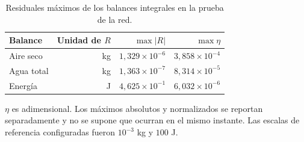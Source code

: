 \begin{table}[htbp]
\centering
\caption{Residuales máximos de los balances integrales en la prueba de la red.}
\label{tab:res_red_balances}
\small
\setlength{\tabcolsep}{5pt}
\begin{tabular}{lrrr}
\toprule
Balance & Unidad de $R$ & $\max|R|$ & $\max\eta$ \\
\midrule
Aire seco & kg & $1{,}329\times10^{-6}$ & $3{,}858\times10^{-4}$ \\
Agua total & kg & $1{,}363\times10^{-7}$ & $8{,}314\times10^{-5}$ \\
Energía & J & $4{,}625\times10^{-1}$ & $6{,}032\times10^{-6}$ \\
\bottomrule
\end{tabular}
\par\vspace{3pt}
\begin{minipage}{0.98\textwidth}\footnotesize
$\eta$ es adimensional. Los máximos absolutos y normalizados se reportan separadamente y no se supone que ocurran en el mismo instante. Las escalas de referencia configuradas fueron $10^{-3}$ kg y $100$ J.
\end{minipage}
\end{table}
